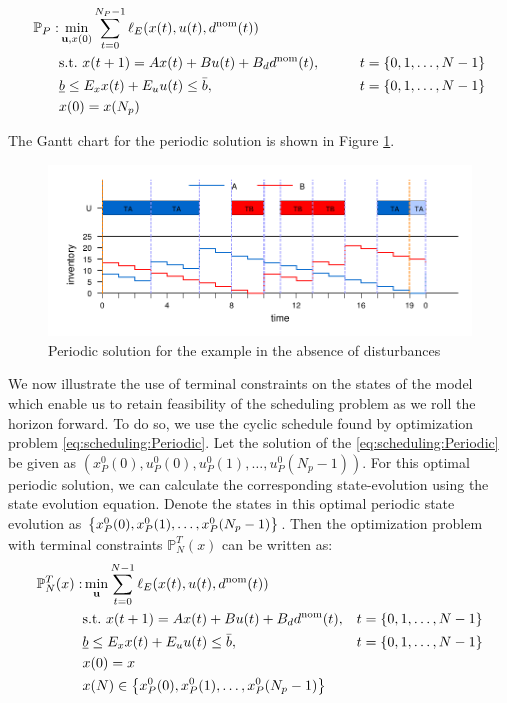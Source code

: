 \begin{alignat}{2}
\label{eq:scheduling:Periodic}
\mathbb{P}_P:& \min_{\mathbf{u},x(0)}{\sum_{t=0}^{N_P-1}
  \ell_E(x(t),u(t),d^{\text{nom}}(t))} &\nonumber \\ 
&\text{s.t.~} x(t+1) = Ax(t) + Bu(t)+B_dd^{\text{nom}}(t), &\qquad t = \left\lbrace 0,1,\ldots,N-1 \right\rbrace\nonumber\\
&\underline{b} \leq E_xx(t) + E_u u(t) \leq \bar{b},& \qquad t = \left\lbrace 0,1,\ldots,N-1 \right\rbrace  \\
& x(0) = x(N_p)& \nonumber
\end{alignat}

The Gantt chart for the periodic solution is shown in Figure
\ref{fig:scheduling:gantt_Periodic}. 

\begin{figure}
\begin{center}
\includegraphics{scheduling/gantt_Periodic.pdf}
\caption{Periodic solution  for the example in the absence of disturbances}
\label{fig:scheduling:gantt_Periodic}
\end{center}
\end{figure}

We now illustrate the use of terminal constraints on the states of the
model which enable us to retain feasibility of the scheduling problem
as we roll the horizon forward. To do so, we use the cyclic schedule
found by optimization problem \eqref{eq:scheduling:Periodic}. Let the
solution of the \eqref{eq:scheduling:Periodic} be given as $(x_P^0(0),
u_P^0(0), u_P^0(1), \ldots, u_P^0(N_p-1))$. For this optimal periodic
solution, we can calculate the corresponding state-evolution using the
state evolution equation. Denote the states in this optimal periodic
state evolution as
$\left\lbrace x_P^0(0),x_P^0(1),\ldots,x_P^0(N_p-1) \right\rbrace$. Then the optimization problem
with terminal constraints $\mathbb{P}_N^T(x)$ can be written as:
\begin{alignat}{2}
\label{eq:scheduling:T}
\mathbb{P}_N^T(x):&
\min_{\mathbf{u}}{\sum_{t=0}^{N-1}\ell_E(x(t),u(t),d^{\text{nom}}(t))}&
\nonumber \\ 
&\text{s.t.~} x(t+1) = Ax(t) + Bu(t)+B_dd^{\text{nom}}(t),& t = \left\lbrace 0,1,\ldots,N-1 \right\rbrace \nonumber\\
&\underline{b} \leq E_xx(t) + E_u u(t) \leq \bar{b},& t = \left\lbrace 0,1,\ldots,N-1 \right\rbrace \\
& x(0) = x &\nonumber\\
& x(N) \in \left\lbrace x_P^0(0),x_P^0(1),\ldots,x_P^0(N_p-1) \right\rbrace&\nonumber
\end{alignat}

